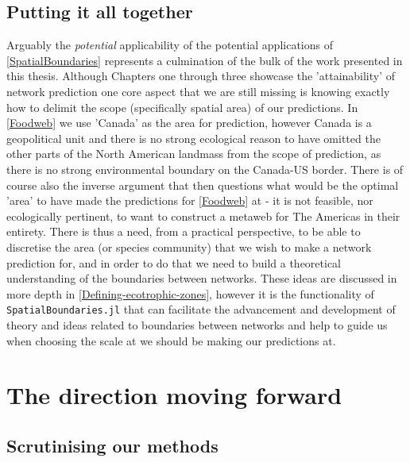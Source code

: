 \begin{refsection}
\subsection{Putting it all together}

Arguably the \emph{potential} applicability of the potential applications of \autoref{SpatialBoundaries} represents a culmination of the bulk of the work presented in this thesis. Although Chapters one through three showcase the 'attainability' of network prediction one core aspect that we are still missing is knowing exactly how to delimit the scope (specifically spatial area) of our predictions. In \autoref{Foodweb} we use 'Canada' as the area for prediction, however Canada is a geopolitical unit and there is no strong ecological reason to have omitted the other parts of the North American landmass from the scope of prediction, as there is no strong environmental boundary on the Canada-US border. There is of course also the inverse argument that then questions what would be the optimal 'area' to have made the predictions for \autoref{Foodweb} at - it is not feasible, nor ecologically pertinent, to want to construct a metaweb for The Americas in their entirety. There is thus a need, from a practical perspective, to be able to discretise the area (or species community) that we wish to make a network prediction for, and in order to do that we need to build a theoretical understanding of the boundaries between networks. These ideas are discussed in more depth in \autoref{Defining-ecotrophic-zones}, however it is the functionality of \texttt{SpatialBoundaries.jl} that can facilitate the advancement and development of theory and ideas related to boundaries between networks and help to guide us when choosing the scale at we should be making our predictions at.

\section{The direction moving forward}

\subsection{Scrutinising our methods}


\end{refsection}

